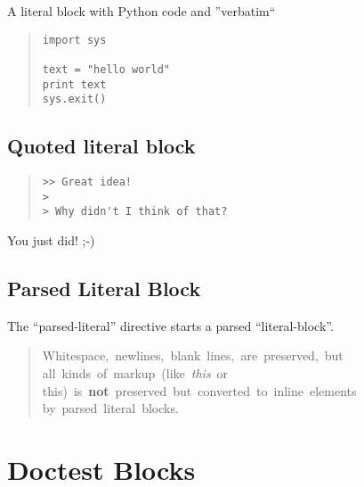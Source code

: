 \documentclass[10pt,a4paper,english]{article}
\begin{document}
A literal block with Python code and ''verbatim``

\begin{quote}
\begin{verbatim}
import sys

text = "hello world"
print text
sys.exit()
\end{verbatim}
\end{quote}



\hypertarget{quoted-literal-block}{}
\subsection*{Quoted literal block}
\begin{quote}\begin{Verbatim}
>> Great idea!
>
> Why didn't I think of	that?
\end{Verbatim}
\end{quote}

You just did!  ;-)



\hypertarget{parsed-literal-block}{}
\subsection*{Parsed Literal Block}

The ``parsed-literal'' directive starts a parsed ``literal-block''.
\begin{quote}{\ttfamily \raggedright \noindent
Whitespace,~newlines,~blank~lines,~are~preserved,~but~\\
all~kinds~of~markup~(like~\emph{this}~or~\\
this)~is~\textbf{not}~preserved~but~converted~to~inline~elements~\\
by~parsed~literal~blocks.
}\end{quote}



\hypertarget{doctest-blocks}{}
\section*{Doctest Blocks}
\end{document}
